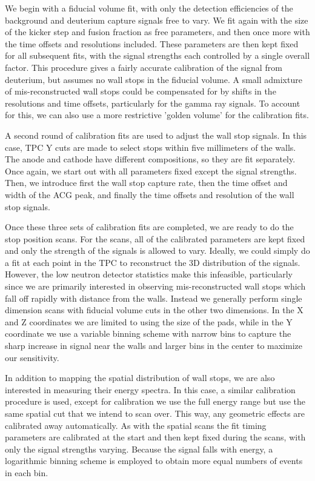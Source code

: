 We begin with a fiducial volume fit, with only the detection efficiencies of the background and deuterium capture signals free to vary.
We fit again with the size of the kicker step and fusion fraction as free parameters, and then once more with the time offsets and resolutions included.
These parameters are then kept fixed for all subsequent fits, with the signal strengths each controlled by a single overall factor.
This procedure gives a fairly accurate calibration of the signal from deuterium, but assumes no wall stops in the fiducial volume.
A small admixture of mis-reconstructed wall stops could be compensated for by shifts in the resolutions and time offsets, particularly for the gamma ray signals.
To account for this, we can also use a more restrictive 'golden volume' for the calibration fits.

A second round of calibration fits are used to adjust the wall stop signals.
In this case, TPC Y cuts are made to select stops within five millimeters of the walls.
The anode and cathode have different compositions, so they are fit separately.
Once again, we start out with all parameters fixed except the signal strengths.
Then, we introduce first the wall stop capture rate, then the time offset and width of the ACG peak, and finally the time offsets and resolution of the wall stop signals.

Once these three sets of calibration fits are completed, we are ready to do the stop position scans.
For the scans, all of the calibrated parameters are kept fixed and only the strength of the signals is allowed to vary.
Ideally, we could simply do a fit at each point in the TPC to reconstruct the 3D distribution of the signals.
However, the low neutron detector statistics make this infeasible, particularly since we are primarily interested in observing mis-reconstructed wall stops which fall off rapidly with distance from the walls.
Instead we generally perform single dimension scans with fiducial volume cuts in the other two dimensions.
In the X and Z coordinates we are limited to using the size of the pads, while in the Y coordinate we use a variable binning scheme with narrow bins to capture the sharp increase in signal near the walls and larger bins in the center to maximize our sensitivity.

In addition to mapping the spatial distribution of wall stops, we are also interested in measuring their energy spectra.
In this case, a similar calibration procedure is used, except for calibration we use the full energy range but use the same spatial cut that we intend to scan over.
This way, any geometric effects are calibrated away automatically.
As with the spatial scans the fit timing parameters are calibrated at the start and then kept fixed during the scans, with only the signal strengths varying.
Because the signal falls with energy, a logarithmic binning scheme is employed to obtain more equal numbers of events in each bin.

